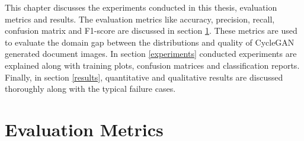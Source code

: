 \setlength{\parskip}{1em}

This chapter discusses the experiments conducted in this thesis, evaluation metrics and results. The evaluation metrics like accuracy, precision, recall, confusion matrix and F1-score are discussed in section \ref{EvaluationMetrics}. These metrics are used to evaluate the domain gap between the distributions and quality of \ac{CycleGAN} generated document images. In section \ref{experiments} conducted experiments are explained along with training plots, confusion matrices and classification reports. Finally, in section \ref{results}, quantitative and qualitative results are discussed thoroughly along with the typical failure cases.

\section{Evaluation Metrics}\label{EvaluationMetrics}



